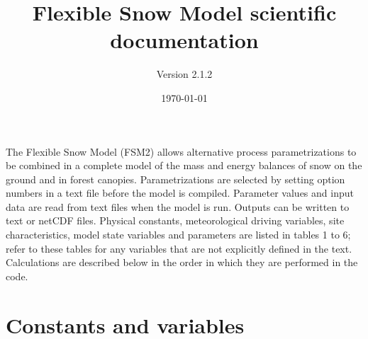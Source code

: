 \documentclass[fleqn]{article}
\title{Flexible Snow Model scientific documentation}
\author{Version 2.1.2}
\date{\today}
\begin{document}
\maketitle

{\parindent 0pt
The Flexible Snow Model (FSM2) allows alternative process parametrizations to be combined in a complete model of the mass and energy balances of snow on the ground and in forest canopies. Parametrizations are selected by setting option numbers in a text file before the model is compiled. Parameter values and input data are read from text files when the model is run. Outputs can be written to text or netCDF files. Physical constants, meteorological driving variables, site characteristics, model state variables and parameters are listed in tables 1 to 6; refer to these tables for any variables that are not explicitly defined in the text. Calculations are described below in the order in which they are performed in the code.
}

\section{Constants and variables}
\end{document}
